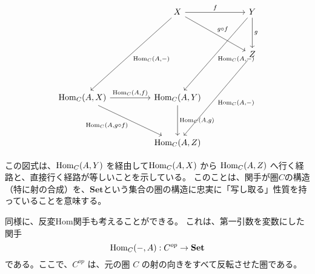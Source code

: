 \documentclass[uplatex,a4j,12pt,dvipdfmx]{jsarticle}
\begin{document}
\[
	\begin{tikzcd}
		&  & X \arrow[rr, "f"] \arrow[rrdd, "g \circ f"] \arrow[lldddd, "{{\rm Hom}_{C}(A, -)}"] &  & Y \arrow[lldddd, "{{\rm Hom}_{C}(A, -)}"] \arrow[dd, "g"] \\
		&  &                                                                                     &  &                                                           \\
		&  &                                                                                     &  & Z \arrow[lldddd, "{{\rm Hom}_{C}(A, -)}"]                 \\
		&  &                                                                                     &  &                                                           \\
		{{\rm Hom}_{C}(A,X)} \arrow[rr, "{{\rm Hom}_{C}(A, f)}"] \arrow[rrdd, "{{\rm Hom}_{C}(A, g \circ f)}"'] &  & {{\rm Hom}_{C}(A, Y)} \arrow[dd, "{{\rm Hom}_{C}(A, g)}"]                           &  &                                                           \\
		&  &                                                                                     &  &                                                           \\
		&  & {{\rm Hom}_{C}(A, Z)}                                                               &  &
	\end{tikzcd}
\]

この図式は、${\rm Hom}_{C}(A,Y)$ を経由して${\rm Hom}_{C}(A,X)$ から ${\rm Hom}_{C}(A,Z)$ へ行く経路と、直接行く経路が等しいことを示している。
このことは、関手が圏$C$の構造（特に射の合成）を、$\mathbf{Set}$という集合の圏の構造に忠実に「写し取る」性質を持っていることを意味する。

同様に、反変Hom関手も考えることができる。
これは、第一引数を変数にした関手
$$
	{\rm Hom}_{C}(-,A) : C^{op} \to \mathbf{Set}
$$
である。ここで、$C^{op}$ は、元の圏 $C$ の射の向きをすべて反転させた圏である。
\end{document}
